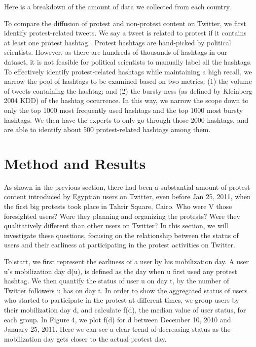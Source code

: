 \documentclass[phd,tocprelim]{cornell}
\begin{document}
Here is a breakdown of the amount of data we collected from each country.

To compare the diffusion of protest and non-protest content on Twitter, we first identify protest-related tweets. We say a tweet is related to protest if it contains at least one protest hashtag .  Protest hashtags are hand-picked by political scientists. However, as there are hundreds of thousands of  hashtags in our dataset, it is not feasible for political scientists to manually label all the hashtags. To effectively identify protest-related hashtags while maintaining a high recall, we narrow the pool of hashtags to be examined based on two metrics: (1) the volume of tweets containing the hashtag; and (2) the bursty-ness (as defined by Kleinberg 2004 KDD) of the hashtag occurrence. In this way, we narrow the scope down to only the top 1000 most frequently used hashtags and the top 1000 most bursty hashtags. We then have the experts to only go through those 2000 hashtags, and are able to identify about 500 protest-related hashtags among them.

\section{Method and Results}
As shown in the previous section, there had been a substantial amount of protest content introduced by Egyptian users on Twitter, even before Jan 25, 2011, when the first big protests took place in Tahrir Square, Cairo. Who were V those foresighted users? Were they planning and organizing the protests? Were  they qualitatively different than other users on Twitter? In this section, we will investigate these questions, focusing on the relationship between the status of users and their earliness at participating in the protest activities on Twitter.

To start, we first represent the earliness of a user by his mobilization day. A user u's mobilization day d(u), is defined as the day when u first used any protest hashtag. We then quantify the status of user u on day t,  by the number of Twitter followers u has on day t. In order to show the aggregated status of users who started to participate in the protest at different times, we group users by their mobilization day d, and calculate f(d), the median value of user status, for each group. In Figure 4, we plot f(d) for d between December 10, 2010 and January 25, 2011. Here we can see a clear trend of decreasing status as the mobilization day gets  closer to the actual protest day.
\end{document}
